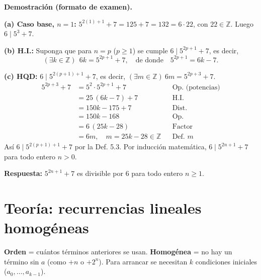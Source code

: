 \documentclass[11pt]{article}
\begin{document}
\textbf{Demostración (formato de examen).}

\textbf{(a) Caso base, $n=1$:} $5^{2(1)+1}+7=125+7=132=6\cdot 22$, con $22\in\mathbb Z$. Luego $6\mid 5^{3}+7$.

\textbf{(b) H.I.:} Suponga que para $n=p$ ($p\ge 1$) se cumple $6\mid 5^{2p+1}+7$, es decir,
\[(\exists k\in\mathbb Z)\ \ 6k=5^{2p+1}+7,\quad\text{de donde}\quad 5^{2p+1}=6k-7.\]

\textbf{(c) HQD:} $6\mid 5^{2(p+1)+1}+7$, es decir, $(\exists m\in\mathbb Z)\ 6m=5^{2p+3}+7$.
\begin{align*}
5^{2p+3}+7 &=5^2\cdot 5^{2p+1}+7 && \text{Op. (potencias)}\\
&=25\,(6k-7)+7 && \text{H.I.}\\
&=150k-175+7 && \text{Dist.}\\
&=150k-168 && \text{Op.}\\
&=6\,(25k-28) && \text{Factor}\\
&=6m,\quad m=25k-28\in\mathbb Z && \text{Def. } m
\end{align*}
Así $6\mid 5^{2(p+1)+1}+7$ por la Def. 5.3. Por inducción matemática, $6\mid 5^{2n+1}+7$ para todo entero $n>0$.

\textbf{Respuesta:} $5^{2n+1}+7$ es divisible por $6$ para todo entero $n\ge1$.

\clearpage
\section*{Teoría: recurrencias lineales homogéneas}

\begin{minipage}[t]{0.55\textwidth}
\textbf{Orden} = cuántos términos anteriores se usan. \textbf{Homogénea} = no hay un término sin $a$ (como $+n$ o $+2^n$). Para arrancar se necesitan $k$ condiciones iniciales ($a_0,\dots,a_{k-1}$).
\end{minipage}\hfill
\begin{minipage}[t]{0.42\textwidth}
\vspace{2pt}
\end{minipage}
\end{document}
